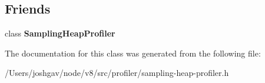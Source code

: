 \subsection*{Friends}
\begin{DoxyCompactItemize}
\item 
class {\bfseries Sampling\+Heap\+Profiler}\hypertarget{classv8_1_1internal_1_1_sampling_heap_profiler_1_1_allocation_node_a1c4268235229c6a40ca92cbcd4591c9b}{}\label{classv8_1_1internal_1_1_sampling_heap_profiler_1_1_allocation_node_a1c4268235229c6a40ca92cbcd4591c9b}

\end{DoxyCompactItemize}


The documentation for this class was generated from the following file\+:\begin{DoxyCompactItemize}
\item 
/\+Users/joshgav/node/v8/src/profiler/sampling-\/heap-\/profiler.\+h\end{DoxyCompactItemize}
